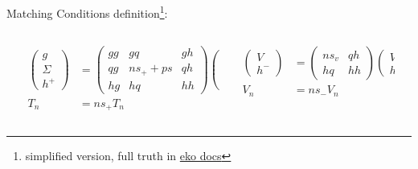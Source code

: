 \documentclass[9pt]{beamer}
\begin{document}
\begin{frame}{Matching Conditions}
definition\footnote{simplified version, full truth in \alert{\href{https://eko.readthedocs.io/en/latest/theory/Matching.html}{eko docs}}}:
    \begin{columns}
        \begin{column}{0.1\textwidth}\end{column}
        \begin{column}{0.4\textwidth}
            \begin{align*}
                \begin{pmatrix}
                    g \\ \Sigma \\ h^+            
                \end{pmatrix}
                &= 
                \begin{pmatrix}
                    gg & gq & gh \\
                    qg & ns_+ + ps & qh \\
                    hg & hq & hh
                \end{pmatrix}
                \begin{pmatrix}
                    g \\ \Sigma \\ h^+            
                \end{pmatrix}
                \\
                T_n &= ns_+ T_n \qquad\qquad  
            \end{align*}
        \end{column}
        \begin{column}{0.4\textwidth}
            \begin{align*}
                \begin{pmatrix}
                    V \\ h^-
                \end{pmatrix}
                &= 
                \begin{pmatrix}
                    ns_v & qh \\
                    hq & hh 
                \end{pmatrix}
                \begin{pmatrix}
                    V \\ h^-
                \end{pmatrix}
                \\
                V_n &= ns_- V_n
            \end{align*}
        \end{column}
        \begin{column}{0.1\textwidth}\end{column}
    \end{columns}


\end{frame}
\end{document}
